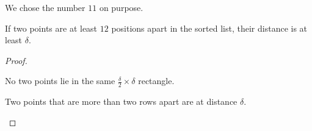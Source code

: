 \begin{listu}
    \begin{remark}
        \begin{minipage}[t]{0.55\linewidth}
            We chose the number $11$ on purpose.

            \begin{claim}
                If two points are at least $12$ positions apart in the sorted list, their distance is at least $\delta$. 
            \end{claim}

            \begin{proof}
                {~~~}

                \begin{listu}
                    \item No two points lie in the same $\frac{\delta}{2} \times \delta$ rectangle. 
                    
                    \item Two points that are more than two rows apart are at distance $\delta$. 
                \end{listu}
            \end{proof}
        \end{minipage}
        \hfill
        \begin{minipage}[t]{0.4\linewidth}
            \begin{center}  \end{center}
        \end{minipage}
    \end{remark}


\end{listu}
